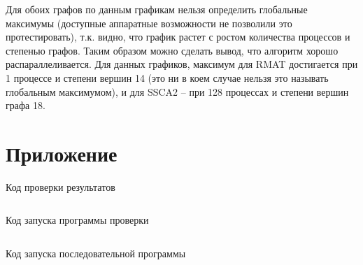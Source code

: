 \documentclass[12pt, a4paper]{article}
\begin{document}
        Для обоих графов по данным графикам нельзя определить глобальные максимумы (доступные аппаратные возможности не позволили это протестировать), т.к. видно, что график растет с ростом количества процессов и степенью графов. Таким образом можно сделать вывод, что алгоритм хорошо распараллеливается. Для данных графиков, максимум для RMAT достигается при 1 процессе и степени вершин 14 (это ни в коем случае нельзя это называть глобальным максимумом), и для SSCA2 -- при 128 процессах и степени вершин графа 18.

    \newpage
    \section{Приложение}
        \begin{listing}[H]
            \caption{Код проверки результатов}
            \label{code:check.cpp}
            \inputminted[breaklines=true,fontsize=\scriptsize,frame=single]{cpp}{check.cpp}
        \end{listing}

        \begin{listing}[H]
            \caption{Код запуска программы проверки}
            \label{code:check.sh}
            \inputminted[breaklines=true,fontsize=\scriptsize,frame=single]{bash}{check.sh}
        \end{listing}

        \begin{listing}[H]
            \caption{Код запуска последовательной программы}
            \label{code:run_st.sh}
            \inputminted[breaklines=true,fontsize=\scriptsize,frame=single]{bash}{run_st.sh}
        \end{listing}
\end{document}
